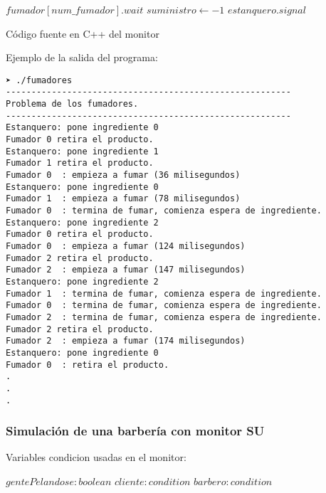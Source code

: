 \documentclass[12pt,a4paper]{article}
\begin{document}
\begin{algorithmic}[0]
 
 
\State $fumador[num\_fumador].wait$
\EndIf
\State $suministro \gets -1$ 
\State $estanquero.signal$
\EndProcedure
\end{algorithmic}

Código fuente en C++ del monitor



Ejemplo de la salida del programa:
\begin{verbatim}
➤ ./fumadores 
--------------------------------------------------------
Problema de los fumadores.
--------------------------------------------------------
Estanquero: pone ingrediente 0
Fumador 0 retira el producto.
Estanquero: pone ingrediente 1
Fumador 1 retira el producto.
Fumador 0  : empieza a fumar (36 milisegundos)
Estanquero: pone ingrediente 0
Fumador 1  : empieza a fumar (78 milisegundos)
Fumador 0  : termina de fumar, comienza espera de ingrediente.
Estanquero: pone ingrediente 2
Fumador 0 retira el producto.
Fumador 0  : empieza a fumar (124 milisegundos)
Fumador 2 retira el producto.
Fumador 2  : empieza a fumar (147 milisegundos)
Estanquero: pone ingrediente 2
Fumador 1  : termina de fumar, comienza espera de ingrediente.
Fumador 0  : termina de fumar, comienza espera de ingrediente.
Fumador 2  : termina de fumar, comienza espera de ingrediente.
Fumador 2 retira el producto.
Fumador 2  : empieza a fumar (174 milisegundos)
Estanquero: pone ingrediente 0
Fumador 0  : retira el producto.
.
.
.
\end{verbatim}



\subsubsection{Simulación de una barbería con monitor SU}

Variables condicion usadas en el monitor:

\begin{algorithmic}[0]
\State $gentePelandose :boolean$ 
\State $cliente : condition$ 
\State $barbero : condition$ 

\end{algorithmic}
\end{document}

